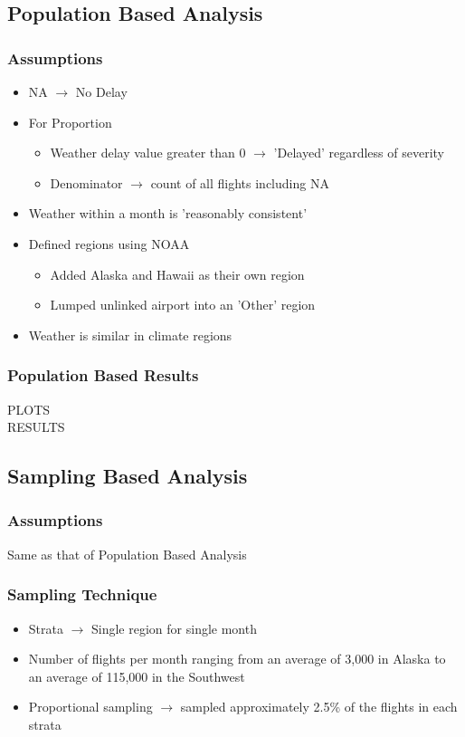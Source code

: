 \documentclass{beamer}
\begin{document}
\subsection{Population Based Analysis}
\begin{frame}
\frametitle{Assumptions} 
\begin{itemize}
\item NA $\rightarrow$ No Delay
\item For Proportion
\begin{itemize}
\item Weather delay value greater than 0 $\rightarrow$ 'Delayed' regardless of severity 
\item Denominator $\rightarrow$ count of all flights including NA
\end{itemize}
\item Weather within a month is 'reasonably consistent'
\item Defined regions using NOAA 
\begin{itemize}
\item  Added Alaska and Hawaii as their own region
\item Lumped unlinked airport into an 'Other' region
\end{itemize}
\item Weather is similar in climate regions
\end{itemize}
\end{frame}

\begin{frame}
\frametitle{Population Based Results}
PLOTS\\
RESULTS
\end{frame}

\subsection{Sampling Based Analysis}
\begin{frame}
\frametitle{Assumptions}
\begin{center}
Same as that of Population Based Analysis 
\end{center}
\end{frame}

\begin{frame}
\frametitle{Sampling Technique}
\begin{itemize}
\item Strata $\rightarrow$ Single region for single month
\item Number of flights per month ranging from an average of 3,000 in Alaska to an average of 115,000 in the Southwest
\item Proportional sampling $\rightarrow$  sampled approximately 2.5\% of the flights in each
strata
\end{itemize} 
\end{frame}
\end{document}
